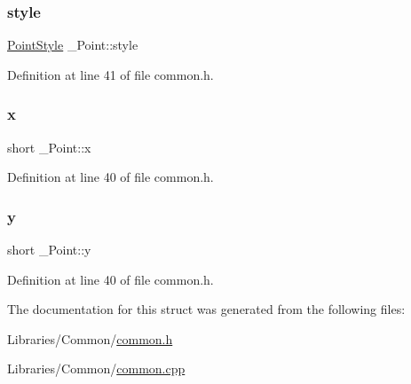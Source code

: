 \subsubsection{\texorpdfstring{style}{style}}
{\footnotesize\ttfamily \mbox{\hyperlink{common_8h_afd9cb36d6ef309c77ea1e3177e19c623}{Point\+Style}} \+\_\+\+Point\+::style}



Definition at line 41 of file common.\+h.

\mbox{\label{struct___point_a1c1cb9f2bfc0c90f1079661912b69e48}} 
\subsubsection{\texorpdfstring{x}{x}}
{\footnotesize\ttfamily short \+\_\+\+Point\+::x}



Definition at line 40 of file common.\+h.

\mbox{\label{struct___point_af63bdd5a8c2fcf3fc4701a1cc6a421df}} 
\subsubsection{\texorpdfstring{y}{y}}
{\footnotesize\ttfamily short \+\_\+\+Point\+::y}



Definition at line 40 of file common.\+h.



The documentation for this struct was generated from the following files\+:\begin{DoxyCompactItemize}
\item 
Libraries/\+Common/\mbox{\hyperlink{common_8h}{common.\+h}}\item 
Libraries/\+Common/\mbox{\hyperlink{common_8cpp}{common.\+cpp}}\end{DoxyCompactItemize}
